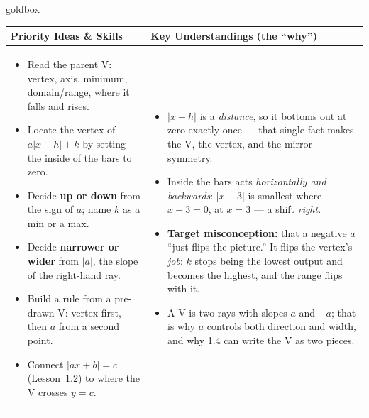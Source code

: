 \documentclass[10pt]{article}
\begin{document}
\renewcommand{\arraystretch}{1.4}
\begin{skillbox}{goldbox}
\begin{tabularx}{\linewidth}{@{}X|X@{}}
\textbf{Priority Ideas \& Skills} & \textbf{Key Understandings (the ``why'')} \\[2pt]
\hline
\vspace{-6pt}
\begin{itemize}[leftmargin=1.1em, nosep, after=\vspace{2pt}]
  \item Read the parent V: vertex, axis, minimum, domain/range, where it falls and rises.
  \item Locate the vertex of $a|x-h|+k$ by setting the inside of the bars to zero.
  \item Decide \textbf{up or down} from the sign of $a$; name $k$ as a min or a max.
  \item Decide \textbf{narrower or wider} from $|a|$, the slope of the right-hand ray.
  \item Build a rule from a pre-drawn V: vertex first, then $a$ from a second point.
  \item Connect $|ax+b|=c$ (Lesson~1.2) to where the V crosses $y=c$.
\end{itemize}
&
\vspace{-6pt}
\begin{itemize}[leftmargin=1.1em, nosep, after=\vspace{2pt}]
  \item $|x-h|$ is a \emph{distance}, so it bottoms out at zero exactly once --- that single fact
        makes the V, the vertex, and the mirror symmetry.
  \item Inside the bars acts \emph{horizontally and backwards}: $|x-3|$ is smallest where
        $x-3=0$, at $x=3$ --- a shift \emph{right}.
  \item \textbf{Target misconception:} that a negative $a$ ``just flips the picture.'' It flips the
        vertex's \emph{job}: $k$ stops being the lowest output and becomes the highest, and the
        range flips with it.
  \item A V is two rays with slopes $a$ and $-a$; that is why $a$ controls both direction and
        width, and why 1.4 can write the V as two pieces.
\end{itemize}
\end{tabularx}
\end{skillbox}
\end{document}
